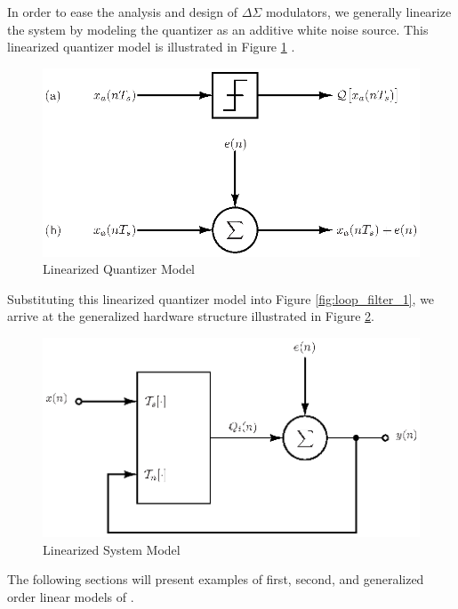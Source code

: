 %
%

In order to ease the analysis and design of $\Delta\Sigma$ modulators, we generally
linearize the system by modeling the quantizer as an additive white noise source. This
linearized quantizer model is illustrated in Figure \ref{fig:linear_quantizer_model}
\cite{hayes_schaums_1998}.
\begin{figure}[htb]
 \centering
 \includegraphics{./final_figures/linear_quantizer_model.eps}
 \caption{Linearized Quantizer Model}
 \label{fig:linear_quantizer_model}
\end{figure}
Substituting this linearized quantizer model into Figure \ref{fig:loop_filter_1}, we
arrive at the generalized hardware structure illustrated in Figure
\ref{fig:loop_filter_sum_noise}.
\begin{figure}[htb]
 \centering
 \includegraphics{./final_figures/loop_filter_sum_noise.eps}
 \caption{Linearized \DSm System Model}
 \label{fig:loop_filter_sum_noise}
\end{figure}
The following sections will present examples of first, second, and
generalized \nth \space order linear models of \DSms. 

